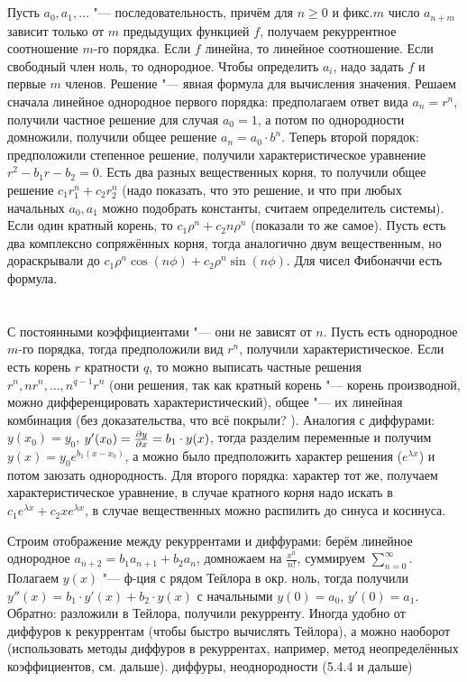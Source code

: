 \section{} %
Пусть $a_0, a_1, \dots$ "--- последовательность, причём для $n\ge 0$ и фикс.$m$
число $a_{n+m}$ зависит только от $m$ предыдущих функцией $f$, получаем рекуррентное соотношение $m$-го порядка.
Если $f$ линейна, то линейное соотношение.
Если свободный член ноль, то однородное.
Чтобы определить $a_i$, надо задать $f$ и первые $m$ членов.
Решение "--- явная формула для вычисления значения.
Решаем сначала линейное однородное первого порядка: предполагаем ответ вида $a_n=r^n$, получили частное решение
для случая $a_0=1$, а потом по однородности домножили, получили общее решение $a_n=a_0\cdot b^n$.
Теперь второй порядок: предположили степенное решение, получили характеристическое уравнение $r^2-b_1r-b_2=0$.
Есть два разных вещественных корня, то получили общее решение $c_1r_1^n+c_2r_2^n$ (надо показать, что это решение,
и что при любых начальных $a_0, a_1$ можно подобрать константы, считаем определитель системы).
Если один кратный корень, то $c_1\rho^n+c_2n\rho^n$ (показали то же самое).
Пусть есть два комплексно сопряжённых корня, тогда аналогично двум вещественным, но дораскрывали до
$c_1 \rho^n \cos (n \phi) + c_2\rho^n \sin(n \phi)$.
Для чисел Фибоначчи есть формула.

\section{} %
С постоянными коэффициентами "--- они не зависят от $n$.
Пусть есть однородное $m$-го порядка, тогда предположили вид $r^n$, получили характеристическое.
Если есть корень $r$ кратности $q$, то можно выписать частные решения $r^n, nr^n, \dots, n^{q-1}r^n$ (они решения,
так как кратный корень "--- корень производной, можно дифференцировать характеристический),
общее "--- их линейная комбинация (без доказательства, что всё покрыли? \TODO).
Аналогия с диффурами: $y(x_0)=y_0$, $y'(x_0)=\frac{\partial y}{\partial x}=b_1\cdot y(x)$, тогда разделим переменные и получим
$y(x)=y_0e^{b_1(x-x_0)}$, а можно было предположить характер решения ($e^{\lambda x}$) и потом заюзать однородность.
Для второго порядка: характер тот же, получаем характеристическое уравнение, в случае кратного корня
надо искать в $c_1e^{\lambda x}+c_2xe^{\lambda x}$, в случае вещественных можно распилить до синуса и косинуса.

Строим отображение между рекуррентами и диффурами: берём линейное однородное $a_{n+2}=b_1a_{n+1}+b_2a_n$,
домножаем на $\frac{x^n}{n!}$, суммируем $\sum_{n=0}^\infty$.
Полагаем $y(x)$ "--- ф-ция с рядом Тейлора в окр. ноль, тогда получили $y''(x)=b_1\cdot y'(x) + b_2 \cdot y(x)$
с начальными $y(0)=a_0$, $y'(0)=a_1$.
Обратно: разложили в Тейлора, получили рекурренту.
Иногда удобно от диффуров к рекуррентам (чтобы быстро вычислять Тейлора), а можно наоборот (использовать методы диффуров в рекуррентах,
например, метод неопределённых коэффициентов, см. дальше).
\TODO диффуры, неоднородности (5.4.4 и дальше)

